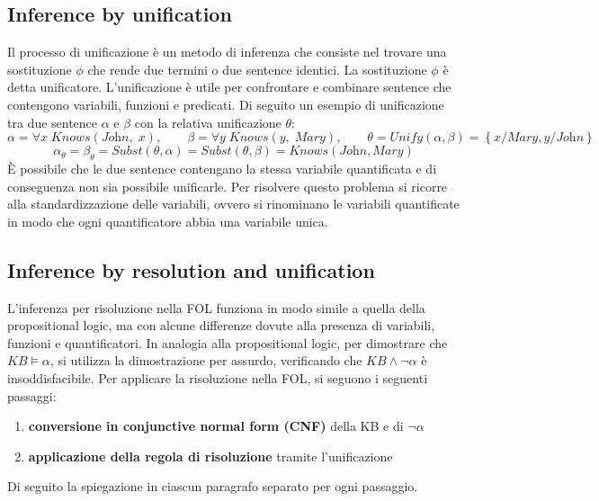 \subsection*{Inference by unification}
Il processo di unificazione è un metodo di inferenza che consiste nel trovare una sostituzione \(\phi\) che rende due termini
o due sentence identici. La sostituzione \(\phi\) è detta unificatore. L'unificazione è utile per confrontare e combinare
sentence che contengono variabili, funzioni e predicati. Di seguito un esempio di unificazione tra due sentence \(\alpha\)
e \(\beta\) con la relativa unificazione \(\theta\):
\[\alpha = \forall x \; \textit{Knows}(\textit{John}, \; x), \qquad \beta = \forall y \; \textit{Knows}(y, \; \textit{Mary}), \qquad \theta = \textit{Unify}(\alpha, \beta) = \left\{ x / \textit{Mary}, y / \textit{John} \right\}\]
\[\alpha_\theta = \beta_\theta = \textit{Subst}( \theta, \alpha ) = \textit{Subst}(\theta, \beta) = \textit{Knows}(\textit{John}, \textit{Mary})\]
È possibile che le due sentence contengano la stessa variabile quantificata e di conseguenza non sia possibile unificarle.
Per risolvere questo problema si ricorre alla standardizzazione delle variabili, ovvero si rinominano le variabili quantificate
in modo che ogni quantificatore abbia una variabile unica.

\subsection*{Inference by resolution and unification}
L'inferenza per risoluzione nella FOL funziona in modo simile a quella della propositional logic, ma con alcune differenze
dovute alla presenza di variabili, funzioni e quantificatori. In analogia alla propositional logic, per dimostrare che
\(KB \models \alpha\), si utilizza la dimostrazione per assurdo, verificando che \(KB \land \neg \alpha\) è insoddisfacibile.
Per applicare la risoluzione nella FOL, si seguono i seguenti passaggi:
\begin{enumerate}
	\item \textbf{conversione in conjunctive normal form (CNF)} della KB e di \(\neg \alpha\)
	\item \textbf{applicazione della regola di risoluzione} tramite l'unificazione
\end{enumerate}
Di seguito la spiegazione in ciascun paragrafo separato per ogni passaggio.

